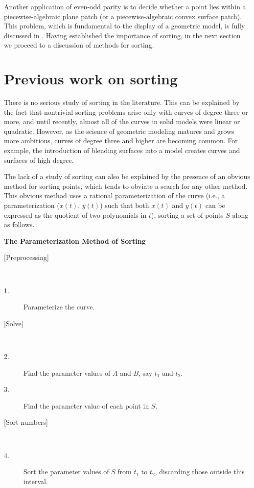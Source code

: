 \vspace{.2in}

Another application of even-odd parity 
is to decide whether a point lies within a piecewise-algebraic plane patch
(or a piecewise-algebraic convex surface patch).
This problem, which is fundamental to the display of a geometric model, 
is fully discussed in \cite{jj}.
Having established the importance of sorting, in the next section 
we proceed to a discussion of methods for sorting.

\section{Previous work on sorting}
\label{sp}
%
There is no serious study of sorting in the literature.
This can be explained by the fact that nontrivial sorting problems
arise only with curves of degree three or more, and until recently, 
almost all of the curves in solid models were linear or quadratic.  
However, as the science of geometric modeling matures and grows more
ambitious, curves of degree three and higher are becoming common.
For example, the introduction of blending surfaces \cite{hh87}
into a model creates curves and surfaces of high degree.

The lack of a study of sorting can also be explained 
by the presence of an obvious method for sorting points, 
which tends to obviate a search for any other method.
This obvious method uses a rational parameterization of the curve
(i.e., a parameterization ($x(t)$, $y(t)$) such that both 
$x(t)$ and $y(t)$ can be expressed as the quotient of two polynomials in $t$),
sorting a set of points $S$ along  as follows.

\vspace{.2in}

\begin{center}{\bf The Parameterization Method of Sorting}\end{center}
\begin{description}
\item[{[Preprocessing]}] \ \ \ 
\item[\hspace{.1in} 1.] Parameterize the curve.
%
\item[{[Solve]}] \ \ \ 
\item[\hspace{.1in} 2.]
	Find the parameter values of $A$ and $B$, say $t_{1}$ and $t_{2}$.
\item[\hspace{.1in} 3.]
	Find the parameter value of each point in $S$.
%
\item[{[Sort numbers]}] \ \ \ 
\item[\hspace{.1in} 4.]
	Sort the parameter values of $S$ from $t_{1}$ to $t_{2}$, discarding
	those outside this interval.
\end{description}

